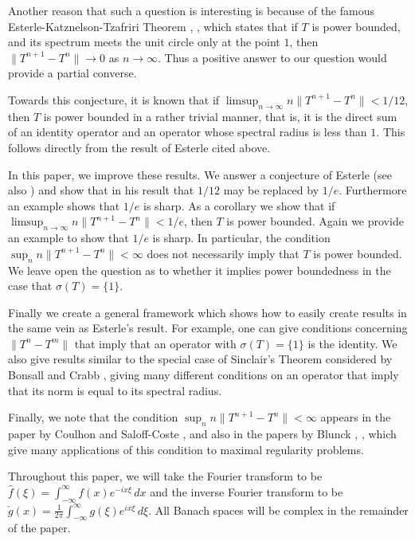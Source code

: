 \documentclass[12pt]{amsart}
\newcommand{\snormo}[1]{{\mathopen\|#1\mathclose\|}}
\begin{document}
Another reason that such a question is
interesting is because of the famous Esterle-Katznelson-Tzafriri Theorem
\cite{esterle}, \cite{Ka}, which states that if $T$ is power bounded,
and its spectrum meets the unit circle only at the point $1$, then
$\snormo{T^{n+1}-T^n} \to 0$ as $n \to \infty$.  Thus a positive answer
to our question would provide a partial converse.

Towards this conjecture,
it is known that if $\limsup_{n\to\infty}n\snormo{T^{n+1}-T^n} < 1/12$,
then $T$ is power bounded in a rather trivial manner, that is, it is the
direct sum of an identity operator
and an operator whose spectral radius is less than $1$.
This follows
directly from the result of Esterle cited above.

In this paper, we improve these results.
We answer a conjecture of Esterle \cite{esterle} (see also \cite{berkani})
and show that in his result that $1/12$ may be replaced by $1/e$.
Furthermore an example shows that $1/e$ is sharp.  As a corollary
we show that if $\limsup_{n\to\infty}n\snormo{T^{n+1}-T^n} < 1/e$, then
$T$ is power bounded.  Again we provide an example to show that $1/e$ is
sharp.
In particular, the
condition $\sup_n n\snormo{T^{n+1}-T^n} < \infty$ does not necessarily imply
that $T$ is power bounded.
We leave open the question as to whether it
implies power boundedness in the case that $\sigma(T) = \{1\}$.

Finally we create a general framework which shows how to
easily create results in the same vein as Esterle's result.
For example, one can give conditions concerning $\snormo{T^n-T^m}$
that imply that an operator with $\sigma(T)=\{1\}$ is the identity.
We also give results similar to the special case of Sinclair's
Theorem \cite{sinclair} considered by Bonsall and Crabb \cite{bonsall-crabb},
giving many different
conditions on an operator that imply that its norm is equal
to its spectral radius.

Finally, we note that
the condition $\sup_n n \snormo{T^{n+1}-T^n} < \infty$ appears in
the paper by Coulhon and Saloff-Coste \cite{coulhon-saloff-coste}, and also
in the papers by
Blunck \cite{blunck1},
\cite{blunck2}, which give
many applications of
this condition
to maximal regularity problems.

Throughout this paper, we will
take the Fourier transform to be
$\hat f(\xi) = \int_{-\infty}^\infty f(x) e^{-i x \xi} \, dx$
and the inverse Fourier transform to be
$\check g(x) = \frac1{2\pi} \int_{-\infty}^\infty g(\xi) e^{i x \xi} \, d\xi$.
All Banach spaces will be complex in the remainder of the paper.
\end{document}
